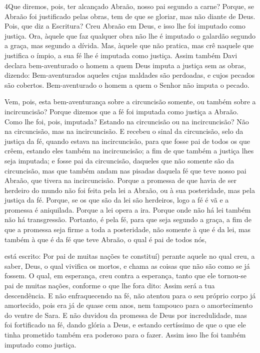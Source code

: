 \medskip

\lettrine{4} Que diremos, pois, ter alcançado Abraão, nosso
pai segundo a carne? Porque, se Abraão foi justificado pelas
obras, tem de que se gloriar, mas não diante de Deus. Pois, que
diz a Escritura? Creu Abraão em Deus, e isso lhe foi imputado como
justiça. Ora, àquele que faz qualquer obra não lhe é imputado o
galardão segundo a graça, mas segundo a dívida. Mas, àquele que
não pratica, mas crê naquele que justifica o ímpio, a sua fé lhe é
imputada como justiça. Assim também Davi declara bem-aventurado
o homem a quem Deus imputa a justiça sem as obras, dizendo:
Bem-aventurados aqueles cujas maldades são perdoadas, e cujos
pecados são cobertos. Bem-aventurado o homem a quem o Senhor não
imputa o pecado.

Vem, pois, esta bem-aventurança sobre a circuncisão somente, ou
também sobre a incircuncisão? Porque dizemos que a fé foi imputada
como justiça a Abraão. Como lhe foi, pois, imputada? Estando
na circuncisão ou na incircuncisão? Não na circuncisão, mas na
incircuncisão. E recebeu o sinal da circuncisão, selo da
justiça da fé, quando estava na incircuncisão, para que fosse pai de
todos os que crêem, estando eles também na incircuncisão; a fim de
que também a justiça lhes seja imputada; e fosse pai da
circuncisão, daqueles que não somente são da circuncisão, mas que
também andam nas pisadas daquela fé que teve nosso pai Abraão, que
tivera na incircuncisão. Porque a promessa de que havia de
ser herdeiro do mundo não foi feita pela lei a Abraão, ou à sua
posteridade, mas pela justiça da fé. Porque, se os que são da
lei são herdeiros, logo a fé é vã e a promessa é aniquilada.
Porque a lei opera a ira. Porque onde não há lei também não
há transgressão. Portanto, é pela fé, para que seja segundo a
graça, a fim de que a promessa seja firme a toda a posteridade, não
somente à que é da lei, mas também à que é da fé que teve Abraão, o
qual é pai de todos nós,

está escrito: Por pai de muitas nações te constituí) perante
aquele no qual creu, a saber, Deus, o qual vivifica os mortos, e
chama as coisas que não são como se já fossem. O qual, em
esperança, creu contra a esperança, tanto que ele tornou-se pai de
muitas nações, conforme o que lhe fora dito: Assim será a tua
descendência. E não enfraquecendo na fé, não atentou para o
seu próprio corpo já amortecido, pois era já de quase cem anos, nem
tampouco para o amortecimento do ventre de Sara. E não
duvidou da promessa de Deus por incredulidade, mas foi fortificado
na fé, dando glória a Deus, e estando certíssimo de que o que
ele tinha prometido também era poderoso para o fazer. Assim
isso lhe foi também imputado como justiça.

